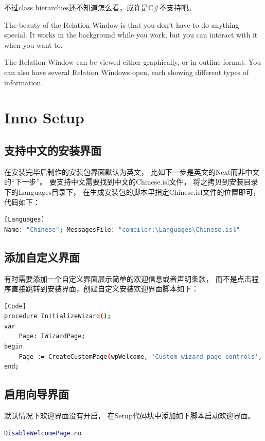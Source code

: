 \documentclass{book}
\begin{document}
不过class hierarchies还不知道怎么看，或许是C\#不支持吧。

The beauty of the Relation Window is that you don’t have to do anything special. 
It works in the background while you work, 
but you can interact with it when you want to.

The Relation Window can be viewed either graphically, 
or in outline format. You can also have several Relation Windows open, 
each showing different types of information.

\section{Inno Setup}

\subsection{支持中文的安装界面}

在安装完毕后制作的安装包界面默认为英文，
比如下一步是英文的Next而非中文的“下一步”。
要支持中文需要找到中文的Chinese.isl文件，
将之拷贝到安装目录下的Languages目录下，
在生成安装包的脚本里指定Chinese.isl文件的位置即可，
代码如下：

\begin{lstlisting}[language=Bash]
[Languages]
Name: "Chinese"; MessagesFile: "compiler:\Languages\Chinese.isl"
\end{lstlisting}

\subsection{添加自定义界面}

有时需要添加一个自定义界面展示简单的欢迎信息或者声明条款，
而不是点击程序直接跳转到安装界面，创建自定义安装欢迎界面脚本如下：

\begin{lstlisting}[language=Bash]
[Code]
procedure InitializeWizard();
var
	Page: TWizardPage;
begin
	Page := CreateCustomPage(wpWelcome, 'Custom wizard page controls', 'TButton and others');
end;
\end{lstlisting}

\subsection{启用向导界面}

默认情况下欢迎界面没有开启，
在Setup代码块中添加如下脚本启动欢迎界面。

\begin{lstlisting}[language=Bash]
DisableWelcomePage=no
\end{lstlisting}
\end{document}
